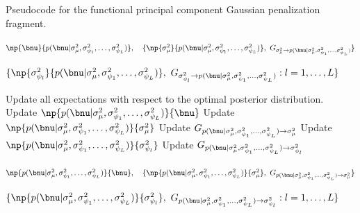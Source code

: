 \documentclass[12pt]{article}
\def\sigsqmu{\sigma^2_{\mu}}
\newcommand\sigsqpsi[1]{\sigma^2_{\psi_{#1}}}
\theoremstyle{plain}
\theoremstyle{definition}
\theoremstyle{remark}
\begin{document}
\begin{algorithm}
	\caption{
		Pseudocode for the functional principal component Gaussian penalization fragment.
	}
	\label{alg:mean_fpc_gauss_pen_frag}
	\begin{algorithmic}[1]
		\Inputs
			\begin{varwidth}[t]{\linewidth} $
				\np{\bnu}{p (\bnu | \sigsqmu, \sigsqpsi{1}, \dots, \sigsqpsi{L})}, \quad
				\{
					\np{\sigsqmu}{p (\bnu | \sigsqmu, \sigsqpsi{1}, \dots, \sigsqpsi{L})}, \
					G_{\sigsqmu \rightarrow p (\bnu | \sigsqmu, \sigsqpsi{1}, \dots, \sigsqpsi{L})}
				\}
			$\par$
				\{
					\np{\sigsqpsi{l}}{p (\bnu | \sigsqmu, \sigsqpsi{1}, \dots, \sigsqpsi{L})}, \
					G_{\sigsqpsi{l} \rightarrow p (\bnu | \sigsqmu, \sigsqpsi{1}, \dots, \sigsqpsi{L})} :
					l = 1, \dots, L
				\}
			$ \end{varwidth}
		\Updates
			\State Update all expectations with respect to the optimal posterior distribution.
			\State Update $\np{p (\bnu | \sigsqmu, \sigsqpsi{1}, \dots, \sigsqpsi{L})}{\bnu}$
				\Comment{equation \eqref{np_pen_nu}}
			\State Update $\np{p (\bnu | \sigsqmu, \sigsqpsi{1}, \dots, \sigsqpsi{L})}{\sigsqmu}$
			\State Update $G_{p (\bnu | \sigsqmu, \sigsqpsi{1}, \dots, \sigsqpsi{L}) \rightarrow \sigsqmu}$
			\For{$l = 1, \dots, L$}
				\State Update $\np{p (\bnu | \sigsqmu, \sigsqpsi{1}, \dots, \sigsqpsi{L})}{\sigsqpsi{l}}$
				\State Update $G_{p (\bnu | \sigsqmu, \sigsqpsi{1}, \dots, \sigsqpsi{L}) \rightarrow \sigsqpsi{l}}$
			\EndFor
		\Outputs
			\begin{varwidth}[t]{\linewidth} $
				\np{p (\bnu | \sigsqmu, \sigsqpsi{1}, \dots, \sigsqpsi{L})}{\bnu}, \quad
				\{
					\np{p (\bnu | \sigsqmu, \sigsqpsi{1}, \dots, \sigsqpsi{L})}{\sigsqmu}, \
					G_{p (\bnu | \sigsqmu, \sigsqpsi{1}, \dots, \sigsqpsi{L}) \rightarrow \sigsqmu}
				\}
			$\par$
				\{
					\np{p (\bnu | \sigsqmu, \sigsqpsi{1}, \dots, \sigsqpsi{L})}{\sigsqpsi{l}}, \
					G_{p (\bnu | \sigsqmu, \sigsqpsi{1}, \dots, \sigsqpsi{L}) \rightarrow \sigsqpsi{l}} :
					l = 1, \dots, L
				\}
			$ \end{varwidth}
	\end{algorithmic}
\end{algorithm}
\end{document}
